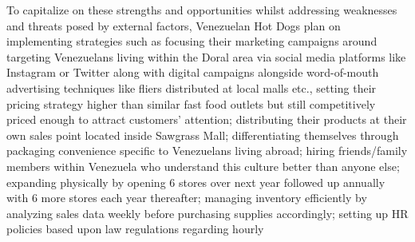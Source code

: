 To capitalize on these strengths and opportunities whilst addressing weaknesses and threats posed by external factors, Venezuelan Hot Dogs plan on implementing strategies such as focusing their marketing campaigns around targeting Venezuelans living within the Doral area via social media platforms like Instagram or Twitter along with digital campaigns alongside word-of-mouth advertising techniques like fliers distributed at local malls etc., setting their pricing strategy higher than similar fast food outlets but still competitively priced enough to attract customers’ attention; distributing their products at their own sales point located inside Sawgrass Mall; differentiating themselves through packaging convenience specific to Venezuelans living abroad; hiring friends/family members within Venezuela who understand this culture better than anyone else; expanding physically by opening 6 stores over next year followed up annually with 6 more stores each year thereafter; managing inventory efficiently by analyzing sales data weekly before purchasing supplies accordingly; setting up HR policies based upon law regulations regarding hourly